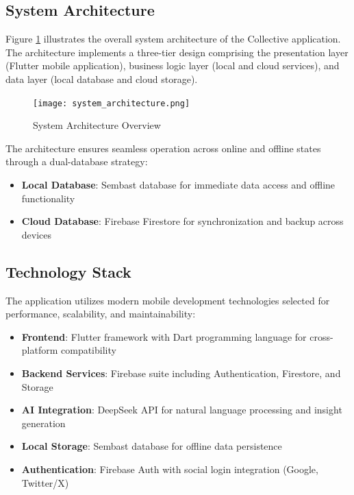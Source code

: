 \documentclass[conference]{IEEEtran}
\begin{document}
{\begin{IEEEkeywords}
\subsection{System Architecture}

Figure \ref{fig:system_architecture} illustrates the overall system architecture of the Collective application. The architecture implements a three-tier design comprising the presentation layer (Flutter mobile application), business logic layer (local and cloud services), and data layer (local database and cloud storage).

\begin{figure}[htbp]
\centerline{\texttt{[image: system\_architecture.png]}}
\caption{System Architecture Overview}
\label{fig:system_architecture}
\end{figure}

The architecture ensures seamless operation across online and offline states through a dual-database strategy:
\begin{itemize}
\item \textbf{Local Database}: Sembast database for immediate data access and offline functionality
\item \textbf{Cloud Database}: Firebase Firestore for synchronization and backup across devices
\end{itemize}

\subsection{Technology Stack}

The application utilizes modern mobile development technologies selected for performance, scalability, and maintainability:

\begin{itemize}
\item \textbf{Frontend}: Flutter framework with Dart programming language for cross-platform compatibility
\item \textbf{Backend Services}: Firebase suite including Authentication, Firestore, and Storage
\item \textbf{AI Integration}: DeepSeek API for natural language processing and insight generation
\item \textbf{Local Storage}: Sembast database for offline data persistence
\item \textbf{Authentication}: Firebase Auth with social login integration (Google, Twitter/X)
\end{itemize}


\end{IEEEkeywords}}
\end{document}
